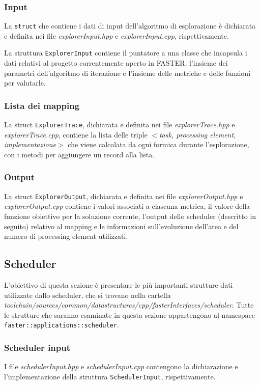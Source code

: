 \subsubsection{Input}
La \verb+struct+ che contiene i dati di input dell'algoritmo di esplorazione
\`e dichiarata e definita nei file \emph{explorerInput.hpp} e \emph{explorerInput.cpp},
rispettivamente.

La struttura \verb+ExplorerInput+ contiene il puntatore a una classe che incapsula i dati relativi al
progetto correntemente aperto in \ac{FASTER}, l'insieme dei parametri dell'algoritmo di
iterazione e l'insieme delle metriche e delle funzioni per valutarle.

\subsubsection{Lista dei mapping}
La struct \verb+ExplorerTrace+, dichiarata e definita nei file \emph{explorerTrace.hpp}
e \emph{explorerTrace.cpp}, contiene la lista delle triple
$<$\emph{task, processing element, implementazione}$>$ che viene calcolata da ogni
formica durante l'esplorazione, con i metodi per aggiungere un record
alla lista.

\subsubsection{Output}
La struct \verb+ExplorerOutput+, dichiarata e definita nei file \emph{explorerOutput.hpp}
e \emph{explorerOutput.cpp} contiene i valori associati a ciascuna metrica, il valore della funzione
obiettivo per la soluzione corrente, l'output dello scheduler (descritto in seguito) relativo
al mapping e le informazioni sull'evoluzione dell'area e del numero di processing element
utilizzati.

\subsection{Scheduler}
\label{subsec:struttureDatiScheduler}
L'obiettivo di questa sezione è presentare le più importanti strutture dati 
utilizzate dallo scheduler, che si trovano nella cartella 
\emph{toolchain/sources/common/datastructures/cpp/fasterInterfaces/scheduler}. 
Tutte le strutture che saranno esaminate in questa sezione appartengono al 
namespace \verb+faster::applications::scheduler+.

\subsubsection{Scheduler input}
I file \emph{schedulerInput.hpp} e \emph{schedulerInput.cpp} contengono la 
dichiarazione e l'implementazione della struttura \verb+SchedulerInput+, 
rispettivamente.

